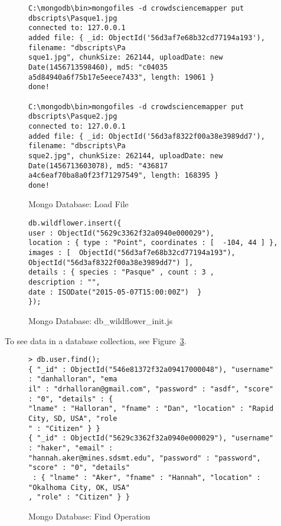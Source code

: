 \begin{figure} [tbh]                     
\caption{Mongo Database: Load File}
\label{db_load_image}    
\begin{lstlisting}
C:\mongodb\bin>mongofiles -d crowdsciencemapper put dbscripts\Pasque1.jpg
connected to: 127.0.0.1
added file: { _id: ObjectId('56d3af7e68b32cd77194a193'), filename: "dbscripts\Pa
sque1.jpg", chunkSize: 262144, uploadDate: new Date(1456713598460), md5: "c04035
a5d84940a6f75b17e5eece7433", length: 19061 }
done!

C:\mongodb\bin>mongofiles -d crowdsciencemapper put dbscripts\Pasque2.jpg
connected to: 127.0.0.1
added file: { _id: ObjectId('56d3af8322f00a38e3989dd7'), filename: "dbscripts\Pa
sque2.jpg", chunkSize: 262144, uploadDate: new Date(1456713603078), md5: "436817
a4c6eaf70ba8a0f23f71297549", length: 168395 }
done!
\end{lstlisting}
\end{figure}

\begin{figure} [tbh]                     
\caption{Mongo Database: db\_wildflower\_init.js}
\label{db_init_wildflower}    
\begin{lstlisting}
db.wildflower.insert({ 
user : ObjectId("5629c3362f32a0940e000029"), 
location : { type : "Point", coordinates : [  -104, 44 ] },
images : [  ObjectId("56d3af7e68b32cd77194a193"),
ObjectId("56d3af8322f00a38e3989dd7") ], 
details : { species : "Pasque" , count : 3 ,
description : "",
date : ISODate("2015-05-07T15:00:00Z")  } 
});
\end{lstlisting}
\end{figure}

To see data in a database collection, see Figure~\ref{db_find}.
\begin{figure} [tbh]                     
\caption{Mongo Database: Find Operation}
\label{db_find}    
\begin{lstlisting}
> db.user.find();
{ "_id" : ObjectId("546e81372f32a09417000048"), "username" : "danhalloran", "ema
il" : "drhalloran@gmail.com", "password" : "asdf", "score" : "0", "details" : {
"lname" : "Halloran", "fname" : "Dan", "location" : "Rapid City, SD, USA", "role
" : "Citizen" } }
{ "_id" : ObjectId("5629c3362f32a0940e000029"), "username" : "haker", "email" :
"hannah.aker@mines.sdsmt.edu", "password" : "password", "score" : "0", "details"
 : { "lname" : "Aker", "fname" : "Hannah", "location" : "Okalhoma City, OK, USA"
, "role" : "Citizen" } }
\end{lstlisting}
\end{figure}

